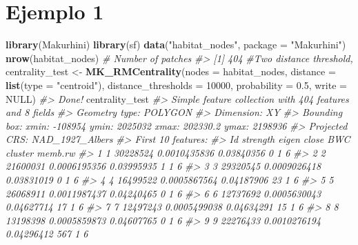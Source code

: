 \documentclass[
]{book}
\newenvironment{Shaded}{\begin{snugshade}}{\end{snugshade}}
\newcommand{\AttributeTok}[1]{\textcolor[rgb]{0.13,0.29,0.53}{#1}}
\newcommand{\CommentTok}[1]{\textcolor[rgb]{0.56,0.35,0.01}{\textit{#1}}}
\newcommand{\ConstantTok}[1]{\textcolor[rgb]{0.56,0.35,0.01}{#1}}
\newcommand{\DecValTok}[1]{\textcolor[rgb]{0.00,0.00,0.81}{#1}}
\newcommand{\FloatTok}[1]{\textcolor[rgb]{0.00,0.00,0.81}{#1}}
\newcommand{\FunctionTok}[1]{\textcolor[rgb]{0.13,0.29,0.53}{\textbf{#1}}}
\newcommand{\NormalTok}[1]{#1}
\newcommand{\OtherTok}[1]{\textcolor[rgb]{0.56,0.35,0.01}{#1}}
\newcommand{\StringTok}[1]{\textcolor[rgb]{0.31,0.60,0.02}{#1}}
\begin{document}
\section{Ejemplo 1}\label{ejemplo-1}

\begin{Shaded}
\begin{Highlighting}[]
\FunctionTok{library}\NormalTok{(Makurhini)}
\FunctionTok{library}\NormalTok{(sf)}
\FunctionTok{data}\NormalTok{(}\StringTok{"habitat\_nodes"}\NormalTok{, }\AttributeTok{package =} \StringTok{"Makurhini"}\NormalTok{)}
\FunctionTok{nrow}\NormalTok{(habitat\_nodes) }\CommentTok{\# Number of patches}
\CommentTok{\#\textgreater{} [1] 404}
\CommentTok{\#Two distance threshold,}
\NormalTok{centrality\_test }\OtherTok{\textless{}{-}} \FunctionTok{MK\_RMCentrality}\NormalTok{(}\AttributeTok{nodes =}\NormalTok{ habitat\_nodes,}
                                \AttributeTok{distance =} \FunctionTok{list}\NormalTok{(}\AttributeTok{type =} \StringTok{"centroid"}\NormalTok{),}
                                 \AttributeTok{distance\_thresholds =} \DecValTok{10000}\NormalTok{,}
                                 \AttributeTok{probability =} \FloatTok{0.5}\NormalTok{,}
                                 \AttributeTok{write =} \ConstantTok{NULL}\NormalTok{)}
\CommentTok{\#\textgreater{} Done!}
\NormalTok{centrality\_test}
\CommentTok{\#\textgreater{} Simple feature collection with 404 features and 8 fields}
\CommentTok{\#\textgreater{} Geometry type: POLYGON}
\CommentTok{\#\textgreater{} Dimension:     XY}
\CommentTok{\#\textgreater{} Bounding box:  xmin: {-}108954 ymin: 2025032 xmax: 202330.2 ymax: 2198936}
\CommentTok{\#\textgreater{} Projected CRS: NAD\_1927\_Albers}
\CommentTok{\#\textgreater{} First 10 features:}
\CommentTok{\#\textgreater{}    Id strength        eigen      close  BWC cluster memb.rw}
\CommentTok{\#\textgreater{} 1   1 30228524 0.0010435836 0.03840356    0       1       6}
\CommentTok{\#\textgreater{} 2   2 21600031 0.0006195356 0.03995935    1       1       6}
\CommentTok{\#\textgreater{} 3   3 29320545 0.0009026418 0.03831019    0       1       6}
\CommentTok{\#\textgreater{} 4   4 16499522 0.0005867564 0.04187906   23       1       6}
\CommentTok{\#\textgreater{} 5   5 26068911 0.0011987437 0.04240465    0       1       6}
\CommentTok{\#\textgreater{} 6   6 12737692 0.0005630043 0.04627714   17       1       6}
\CommentTok{\#\textgreater{} 7   7 12497243 0.0005499038 0.04634291   15       1       6}
\CommentTok{\#\textgreater{} 8   8 13198398 0.0005859873 0.04607765    0       1       6}
\CommentTok{\#\textgreater{} 9   9 22276433 0.0010276194 0.04296412  567       1       6}

\end{Highlighting}
\end{Shaded}
\end{document}
